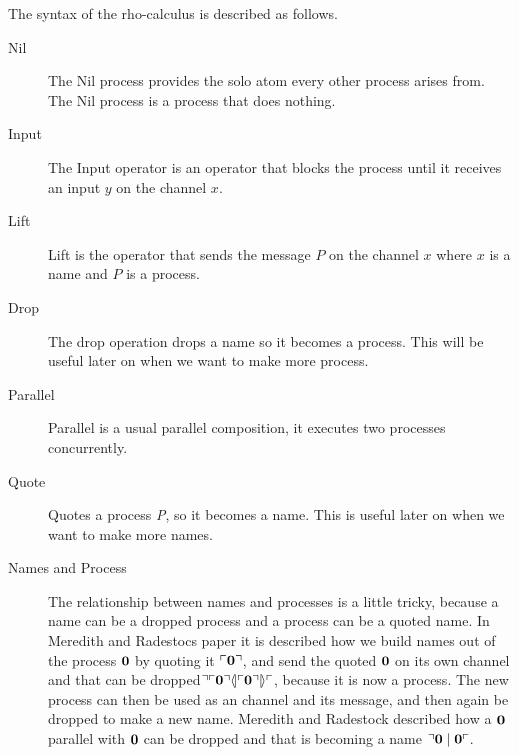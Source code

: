 The syntax of the rho-calculus is described as follows.\\

\begin{description}
    \item[Nil] The Nil process provides the solo atom every other process arises from. The Nil process is a process that does nothing.
    \item[Input] The Input operator is an operator that blocks the process until it receives an input $y$ on the channel $x$.
    \item[Lift] Lift is the operator that sends the message $P$ on the channel $x$ where $x$ is a name and $P$ is a process.
    \item[Drop] The drop operation drops a name so it becomes a process. This will be useful later on when we want to make more process.
    \item[Parallel] Parallel is a usual parallel composition, it executes two processes concurrently.
    \item[Quote] Quotes a process \textit{P}, so it becomes a name. This is useful later on when we want to make more names.
    \item[Names and Process] The relationship between names and processes is a little tricky, because a name can be a dropped process and a process can be a quoted name. In Meredith and Radestocs paper\citep{Meredith2005} it is described how we build names out of the process $\mathbf{0}$ by quoting it $\ulcorner \mathbf{0} \urcorner$, and  send the quoted $\mathbf{0}$ on its own channel and that can be dropped$\urcorner \ulcorner \mathbf{0} \urcorner \langle \! | \ulcorner \mathbf{0} \urcorner | \! \rangle \ulcorner$, because it is now a process. The new process can then be used as an channel and its message, and then again be dropped to make a new name. Meredith and Radestock\citep{Meredith2005} described how a $\mathbf{0}$ parallel with $\mathbf{0}$ can be dropped and that is becoming a name $\urcorner \mathbf{0} \mid \mathbf{0} \ulcorner$.
\end{description}
